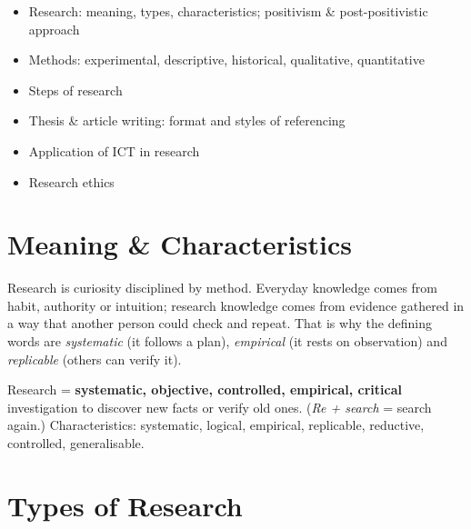 

\begin{sylbox}

\begin{itemize}
\tightlist
\item[$\square$]
  Research: meaning, types, characteristics; positivism \& post-positivistic approach
\item[$\square$]
  Methods: experimental, descriptive, historical, qualitative, quantitative
\item[$\square$]
  Steps of research
\item[$\square$]
  Thesis \& article writing: format and styles of referencing
\item[$\square$]
  Application of ICT in research
\item[$\square$]
  Research ethics
\end{itemize}

\end{sylbox}

\needspace{191pt}

\hypertarget{p1-02--1-meaning--characteristics}{%
\section{Meaning \& Characteristics}\label{p1-02--1-meaning--characteristics}}

Research is curiosity disciplined by method. Everyday knowledge comes from habit, authority or intuition;
research knowledge comes from evidence gathered in a way that another person could check and repeat. That
is why the defining words are \emph{systematic} (it follows a plan), \emph{empirical} (it rests on observation) and
\emph{replicable} (others can verify it).

Research = \textbf{systematic, objective, controlled, empirical, critical} investigation to discover new facts or verify old ones.
(\emph{Re + search} = search again.) Characteristics: systematic, logical, empirical, replicable, reductive, controlled, generalisable.

\needspace{125pt}

\hypertarget{p1-02--2-types-of-research}{%
\section{Types of Research}\label{p1-02--2-types-of-research}}

